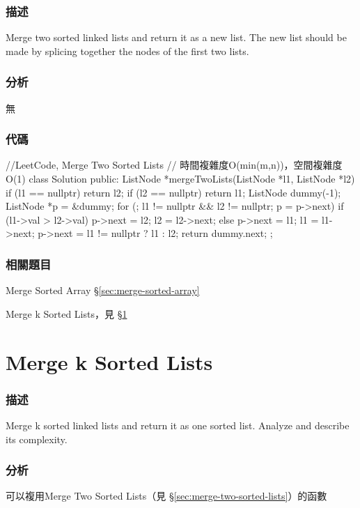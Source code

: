 \subsubsection{描述}
Merge two sorted linked lists and return it as a new list. The new list should be made by splicing together the nodes of the first two lists.


\subsubsection{分析}
無


\subsubsection{代碼}
\begin{Code}
//LeetCode, Merge Two Sorted Lists
// 時間複雜度O(min(m,n))，空間複雜度O(1)
class Solution {
public:
    ListNode *mergeTwoLists(ListNode *l1, ListNode *l2) {
        if (l1 == nullptr) return l2;
        if (l2 == nullptr) return l1;
        ListNode dummy(-1);
        ListNode *p = &dummy;
        for (; l1 != nullptr && l2 != nullptr; p = p->next) {
            if (l1->val > l2->val) { p->next = l2; l2 = l2->next; }
            else { p->next = l1; l1 = l1->next; }
        }
        p->next = l1 != nullptr ? l1 : l2;
        return dummy.next;
    }
};
\end{Code}


\subsubsection{相關題目}
\begindot
\item Merge Sorted Array \S \ref{sec:merge-sorted-array}
\item Merge k Sorted Lists，見 \S \ref{sec:merge-k-sorted-lists}
\myenddot


\section{Merge k Sorted Lists} %
\label{sec:merge-k-sorted-lists}


\subsubsection{描述}
Merge k sorted linked lists and return it as one sorted list. Analyze and describe its complexity.


\subsubsection{分析}
可以複用Merge Two Sorted Lists（見 \S \ref{sec:merge-two-sorted-lists}）的函數


